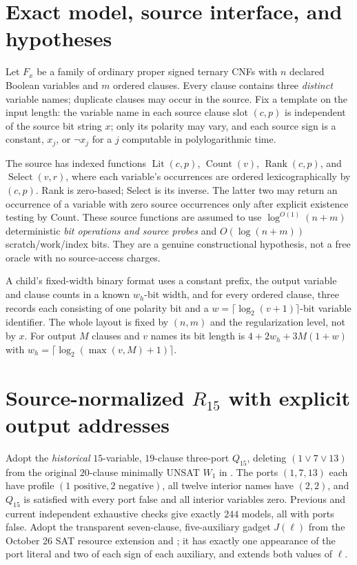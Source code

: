 \documentclass[11pt]{article}
\begin{document}
\section{Exact model, source interface, and hypotheses}
Let $F_x$ be a family of ordinary proper signed ternary CNFs with $n$ declared Boolean variables and $m$ ordered clauses. Every clause contains three \emph{distinct} variable names; duplicate clauses may occur in the source. Fix a template on the input length: the variable name in each source clause slot $(c,p)$ is independent of the source bit string $x$; only its polarity may vary, and each source sign is a constant, $x_j$, or $\neg x_j$ for a $j$ computable in polylogarithmic time.

The source has indexed functions $\operatorname{Lit}(c,p)$, $\operatorname{Count}(v)$, $\operatorname{Rank}(c,p)$, and $\operatorname{Select}(v,r)$, where each variable's occurrences are ordered lexicographically by $(c,p)$. Rank is zero-based; Select is its inverse. The latter two may return an occurrence of a variable with zero source occurrences only after explicit existence testing by Count. These source functions are assumed to use $\log^{O(1)}(n+m)$ deterministic \emph{bit operations and source probes} and $O(\log(n+m))$ scratch/work/index bits. They are a genuine constructional hypothesis, not a free oracle with no source-access charges.

A child's fixed-width binary format uses a constant prefix, the output variable and clause counts in a known $w_h$-bit width, and for every ordered clause, three records each consisting of one polarity bit and a $w=\lceil\log_2(v+1)\rceil$-bit variable identifier. The whole layout is fixed by $(n,m)$ and the regularization level, not by $x$. For output $M$ clauses and $v$ names its bit length is $4+2w_h+3M(1+w)$ with $w_h=\lceil\log_2(\max(v,M)+1)\rceil$.

\section{Source-normalized $R_{15}$ with explicit output addresses}
Adopt the \emph{historical} $15$-variable, $19$-clause three-port $Q_{15}$, deleting $(1\vee7\vee13)$ from the original $20$-clause minimally UNSAT $W_1$ in \cite{PCRETRACT1}. The ports $(1,7,13)$ each have profile $(1\text{ positive},2\text{ negative})$, all twelve interior names have $(2,2)$, and $Q_{15}$ is satisfied with every port false and all interior variables zero. Previous and current independent exhaustive checks give exactly $244$ models, all with ports false. Adopt the transparent seven-clause, five-auxiliary gadget $J(\ell)$ from the October 26 SAT resource extension and \cite{QSWAP}; it has exactly one appearance of the port literal and two of each sign of each auxiliary, and extends both values of $\ell$.
\end{document}
